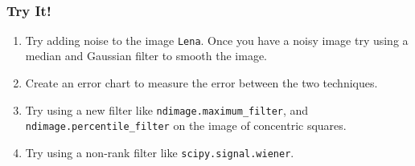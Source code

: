 \documentclass{article}
\begin{document}
    \begin{center}
    \end{center}
    { \hspace*{\fill} \\}
    
    \subsubsection{Try It!}\label{try-it}

\begin{enumerate}
\def\labelenumi{\arabic{enumi}.}
\itemsep1pt\parskip0pt
\item
  Try adding noise to the image \texttt{Lena}. Once you have a noisy
  image try using a median and Gaussian filter to smooth the image.
\item
  Create an error chart to measure the error between the two techniques.
\item
  Try using a new filter like \texttt{ndimage.maximum\_filter}, and
  \texttt{ndimage.percentile\_filter} on the image of concentric
  squares.
\item
  Try using a non-rank filter like \texttt{scipy.signal.wiener}.
\end{enumerate}


    
    
    
    
\end{document}

